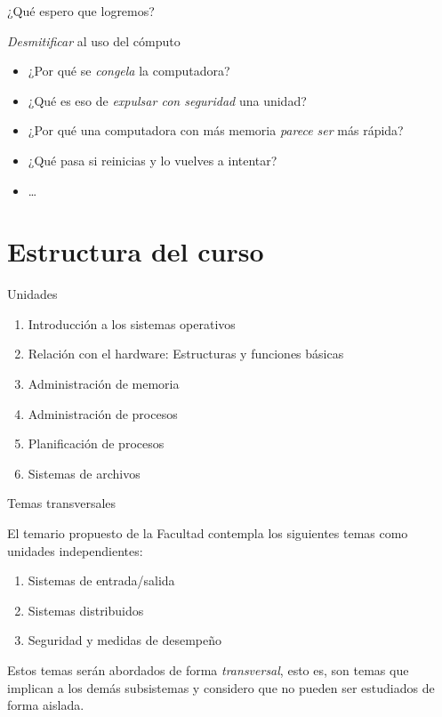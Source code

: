\documentclass[presentation]{beamer}
\begin{document}
\begin{frame}[label={sec:org0e1dba5}]{¿Qué espero que logremos?}
\begin{center}
\emph{Desmitificar} al uso del cómputo
\end{center}
\begin{itemize}
\item ¿Por qué se \emph{congela} la computadora?
\item ¿Qué es eso de \emph{expulsar con seguridad} una unidad?
\item ¿Por qué una computadora con más memoria \emph{parece ser} más rápida?
\item ¿Qué pasa si reinicias y lo vuelves a intentar?
\item \ldots{}
\end{itemize}
\end{frame}

\section{Estructura del curso}
\label{sec:org4a1a872}
\begin{frame}[label={sec:orgf8e6e54}]{Unidades}
\begin{enumerate}
\item Introducción a los sistemas operativos
\item Relación con el hardware: Estructuras y funciones básicas
\item Administración de memoria
\item Administración de procesos
\item Planificación de procesos
\item Sistemas de archivos
\end{enumerate}
\end{frame}

\begin{frame}[label={sec:orga8709a2}]{Temas transversales}
\begin{center}
El temario propuesto de la Facultad contempla los siguientes temas
como unidades independientes:
\end{center}
\begin{enumerate}
\item Sistemas de entrada/salida
\item Sistemas distribuidos
\item Seguridad y medidas de desempeño
\end{enumerate}
\begin{center}
Estos temas serán abordados de forma \emph{transversal}, esto es,
son temas que implican a los demás subsistemas y considero que no
pueden ser estudiados de forma aislada.
\end{center}
\end{frame}
\end{document}
